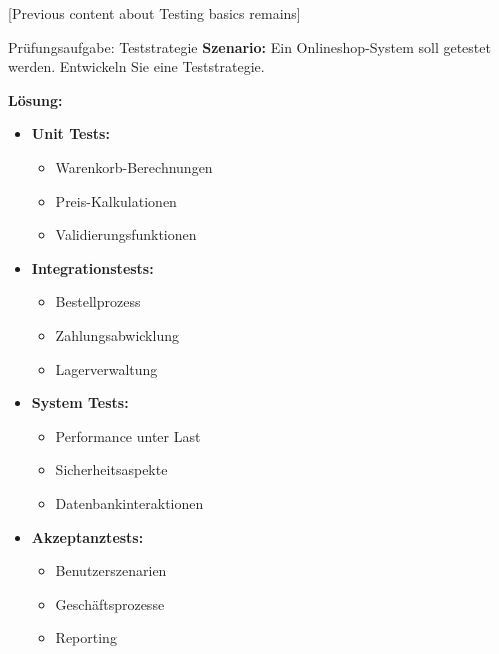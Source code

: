 [Previous content about Testing basics remains]

\begin{example}{Prüfungsaufgabe: Teststrategie}
\textbf{Szenario:}
Ein Onlineshop-System soll getestet werden. Entwickeln Sie eine Teststrategie.

\textbf{Lösung:}
\begin{itemize}
    \item \textbf{Unit Tests:}
    \begin{itemize}
        \item Warenkorb-Berechnungen
        \item Preis-Kalkulationen
        \item Validierungsfunktionen
    \end{itemize}
    
    \item \textbf{Integrationstests:}
    \begin{itemize}
        \item Bestellprozess
        \item Zahlungsabwicklung
        \item Lagerverwaltung
    \end{itemize}
    
    \item \textbf{System Tests:}
    \begin{itemize}
        \item Performance unter Last
        \item Sicherheitsaspekte
        \item Datenbankinteraktionen
    \end{itemize}
    
    \item \textbf{Akzeptanztests:}
    \begin{itemize}
        \item Benutzerszenarien
        \item Geschäftsprozesse
        \item Reporting
    \end{itemize}
\end{itemize}
\end{example}


